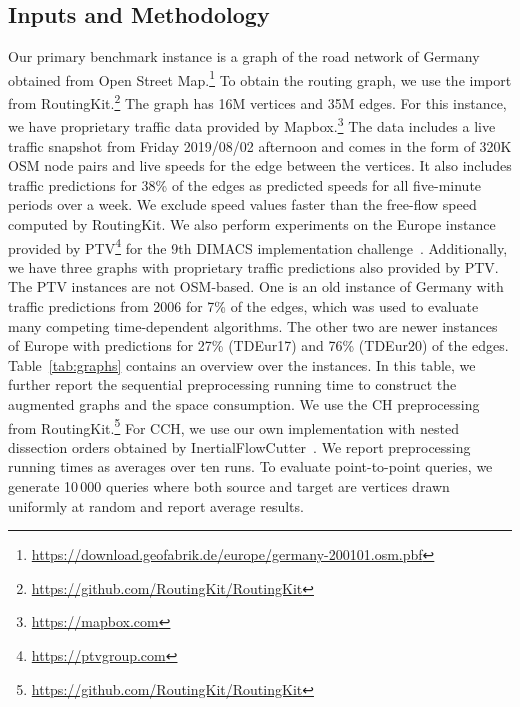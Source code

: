 \documentclass[manuscript,review]{acmart}
\begin{document}
\subsection{Inputs and Methodology}
Our primary benchmark instance is a graph of the road network of Germany obtained from Open Street Map.\footnote{\url{https://download.geofabrik.de/europe/germany-200101.osm.pbf}}
To obtain the routing graph, we use the import from RoutingKit.\footnote{\url{https://github.com/RoutingKit/RoutingKit}}
The graph has 16M vertices and 35M edges.
For this instance, we have proprietary traffic data provided by Mapbox.\footnote{\url{https://mapbox.com}}
The data includes a live traffic snapshot from Friday 2019/08/02 afternoon and comes in the form of 320K OSM node pairs and live speeds for the edge between the vertices.
It also includes traffic predictions for 38\% of the edges as predicted speeds for all five-minute periods over a week.
We exclude speed values faster than the free-flow speed computed by RoutingKit.
We also perform experiments on the Europe instance provided by PTV\footnote{\url{https://ptvgroup.com}} for the 9th DIMACS implementation challenge~\cite{DemetrescuGJ09}.
Additionally, we have three graphs with proprietary traffic predictions also provided by PTV.
The PTV instances are not OSM-based.
One is an old instance of Germany with traffic predictions from 2006 for 7\% of the edges, which was used to evaluate many competing time-dependent algorithms.
The other two are newer instances of Europe with predictions for 27\% (TDEur17) and 76\% (TDEur20) of the edges.
Table~\ref{tab:graphs} contains an overview over the instances.
In this table, we further report the sequential preprocessing running time to construct the augmented graphs and the space consumption.
We use the CH preprocessing from RoutingKit.\footnote{\url{https://github.com/RoutingKit/RoutingKit}}
For CCH, we use our own implementation with nested dissection orders obtained by InertialFlowCutter~\cite{GottesburenHUW19}.
We report preprocessing running times as averages over ten runs.
To evaluate point-to-point queries, we generate 10\,000 queries where both source and target are vertices drawn uniformly at random and report average results.

\begin{table}
\centering
\caption{
Instances used in the evaluation with preprocessing running times to construct (C)CH-Potentials.
With CCH-Potentials, $w_{\ell}$ can be updated by rerunning Phase 2.
}\label{tab:graphs}

\end{table}
\end{document}

